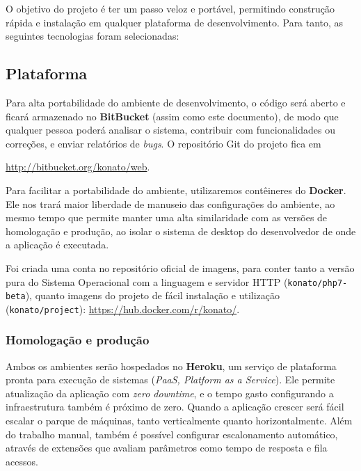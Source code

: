 \documentclass[12pt,a4paper,twoside,hyphens,english,brazil]{abntex2}
\begin{document}
O objetivo do projeto é ter um passo veloz e portável, permitindo construção rápida e instalação em qualquer plataforma de desenvolvimento. Para tanto, as seguintes tecnologias foram selecionadas:

\subsection{Plataforma}
Para alta portabilidade do ambiente de desenvolvimento, o código será aberto e ficará armazenado no \textbf{BitBucket} (assim como este documento), de modo que qualquer pessoa poderá analisar o sistema, contribuir com funcionalidades ou correções, e enviar relatórios de \textit{bugs}. O repositório Git do projeto fica em {\url{http://bitbucket.org/konato/web}.

Para facilitar a portabilidade do ambiente, utilizaremos contêineres do \textbf{Docker}\footnotemark. Ele nos trará maior liberdade de manuseio das configurações do ambiente, ao mesmo tempo que permite manter uma alta similaridade com as versões de homologação e produção, ao isolar o sistema de desktop do desenvolvedor de onde a aplicação é executada.\cite{docker-presentation}

Foi criada uma conta no repositório oficial de imagens, para conter tanto a versão pura do Sistema Operacional com a linguagem e servidor HTTP (\texttt{konato/php7-beta}), quanto imagens do projeto de fácil instalação e utilização (\texttt{konato/project}): \url{https://hub.docker.com/r/konato/}.


\subsubsection*{Homologação e produção}
Ambos os ambientes serão hospedados no \textbf{Heroku}, um serviço de plataforma pronta para execução de sistemas (\textit{PaaS, Platform as a Service}). Ele permite atualização da aplicação com \textit{zero downtime}, e o tempo gasto configurando a infraestrutura também é próximo de zero. Quando a aplicação crescer será fácil escalar o parque de máquinas, tanto verticalmente quanto horizontalmente. Além do trabalho manual, também é possível configurar escalonamento automático, através de extensões que avaliam parâmetros como tempo de resposta e fila acessos\cite{heroku-hirefire}\cite{heroku-adept}.

}
\end{document}
